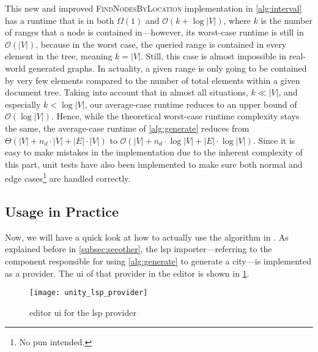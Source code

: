 \documentclass[../thesis]{subfiles}
\begin{document}
This new and improved \textsc{FindNodesByLocation} implementation in \cref{alg:interval} has a runtime that is in both $\Omega(1)$ and $\mathcal{O}(k + \log |V|)$, where $k$ is the number of \glspl{range} that a node is contained in---however, its worst-case runtime is still in $\mathcal{O}(|V|)$, because in the worst case, the queried range is contained in every element in the tree, meaning $k = |V|$.
Still, this case is almost impossible in real-world generated graphs.
In actuality, a given range is only going to be contained by very few elements compared to the number of total elements within a given document tree.
Taking into account that in almost all situations, $k \ll |V|$, and especially $k < \log |V|$, our average-case runtime reduces to an upper bound of $\mathcal{O}(\log |V|)$.
Hence, while the theoretical worst-case runtime complexity stays the same, the average-case runtime of \cref{alg:generate} reduces from $\Theta(|V| + n_d \cdot |V| + |E| \cdot |V|)$ to $\mathcal{O}(|V| + n_d \cdot \log |V| + |E| \cdot \log |V|)$.
Since it is easy to make mistakes in the implementation due to the inherent complexity of this part, unit tests have also been implemented to make sure both normal and edge cases\footnote{
	No pun intended.
} are handled correctly.

\subsection{Usage in Practice}\label{subsec:alg_editor}
Now, we will have a quick look at how to actually use the algorithm in \SEE{}.
As explained before in \cref{subsec:seeother}, the \gls{lsp} importer---referring to the component responsible for using \cref{alg:generate} to generate a \gls{city}---is implemented as a \gls{provider}.
The \gls{ui} of that \gls{provider} in the \gls{editor} is shown in \cref{fig:unity_lsp_provider}.

\begin{figure}
	\begin{center}
		\texttt{[image: unity\_lsp\_provider]}
	\end{center}
	\caption{\gls{editor} \gls{ui} for the \gls{lsp} \gls{provider}}\label{fig:unity_lsp_provider}
\end{figure}
\end{document}
